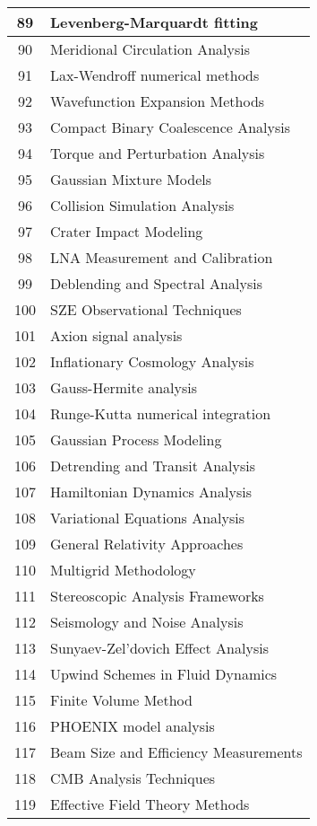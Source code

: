 \begin{table}[htbp]
\begin{tabular}{|c|l|}
\hline
89 & Levenberg-Marquardt fitting \\
\hline
90 & Meridional Circulation Analysis \\
\hline
91 & Lax-Wendroff numerical methods \\
\hline
92 & Wavefunction Expansion Methods \\
\hline
93 & Compact Binary Coalescence Analysis \\
\hline
94 & Torque and Perturbation Analysis \\
\hline
95 & Gaussian Mixture Models \\
\hline
96 & Collision Simulation Analysis \\
\hline
97 & Crater Impact Modeling \\
\hline
98 & LNA Measurement and Calibration \\
\hline
99 & Deblending and Spectral Analysis \\
\hline
100 & SZE Observational Techniques \\
\hline
101 & Axion signal analysis \\
\hline
102 & Inflationary Cosmology Analysis \\
\hline
103 & Gauss-Hermite analysis \\
\hline
104 & Runge-Kutta numerical integration \\
\hline
105 & Gaussian Process Modeling \\
\hline
106 & Detrending and Transit Analysis \\
\hline
107 & Hamiltonian Dynamics Analysis \\
\hline
108 & Variational Equations Analysis \\
\hline
109 & General Relativity Approaches \\
\hline
110 & Multigrid Methodology \\
\hline
111 & Stereoscopic Analysis Frameworks \\
\hline
112 & Seismology and Noise Analysis \\
\hline
113 & Sunyaev-Zel'dovich Effect Analysis \\
\hline
114 & Upwind Schemes in Fluid Dynamics \\
\hline
115 & Finite Volume Method \\
\hline
116 & PHOENIX model analysis \\
\hline
117 & Beam Size and Efficiency Measurements \\
\hline
118 & CMB Analysis Techniques \\
\hline
119 & Effective Field Theory Methods \\

\end{tabular}
\end{table}
